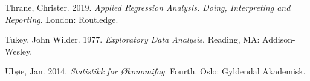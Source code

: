 \documentclass[
]{article}
\newlength{\cslhangindent}
\newlength{\cslentryspacingunit} %
\newenvironment{CSLReferences}[2] %
 {%
  \setlength{\parindent}{0pt}
  \ifodd #1
  \let\oldpar\par
  \def\par{\hangindent=\cslhangindent\oldpar}
  \fi
  \setlength{\parskip}{#2\cslentryspacingunit}
 }%
 {}
\begin{document}
\begin{CSLReferences}{1}{0}
\leavevmode{}%
Thrane, Christer. 2019. \emph{Applied {Regression Analysis}. {Doing},
{Interpreting} and {Reporting}}. {London}: {Routledge}.

\leavevmode{}%
Tukey, John Wilder. 1977. \emph{Exploratory {Data Analysis}}. {Reading,
MA}: {Addison-Wesley}.

\leavevmode{}%
Ubøe, Jan. 2014. \emph{Statistikk for Økonomifag}. Fourth. {Oslo}:
{Gyldendal Akademisk}.

\end{CSLReferences}
\end{document}

